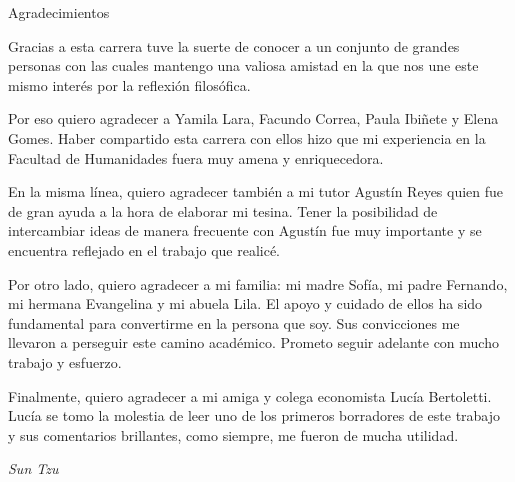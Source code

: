 \begin{center}

\thispagestyle{empty}

\normalsize Agradecimientos

\end{center}

\vspace{3mm}

\normalsize Gracias a esta carrera tuve la suerte de conocer a un conjunto de grandes personas con las cuales mantengo una valiosa amistad en la que nos une este mismo interés por la reflexión filosófica.

Por eso quiero agradecer a Yamila Lara, Facundo Correa, Paula Ibiñete y Elena Gomes. Haber compartido esta carrera con ellos hizo que mi experiencia en la Facultad de Humanidades fuera muy amena y enriquecedora.

En la misma línea, quiero agradecer también a mi tutor Agustín Reyes quien fue de gran ayuda a la hora de elaborar mi tesina. Tener la posibilidad de intercambiar ideas de manera frecuente con Agustín fue muy importante y se encuentra reflejado en el trabajo que realicé.

Por otro lado, quiero agradecer a mi familia: mi madre Sofía, mi padre Fernando, mi hermana Evangelina y mi abuela Lila. El apoyo y cuidado de ellos ha sido fundamental para convertirme en la persona que soy. Sus convicciones me llevaron a perseguir este camino académico. Prometo seguir adelante con mucho trabajo y esfuerzo.

Finalmente, quiero agradecer a mi amiga y colega economista Lucía Bertoletti. Lucía se tomo la molestia de leer uno de los primeros borradores de este trabajo y sus comentarios brillantes, como siempre, me fueron de mucha utilidad.

\newpage

\begin{flushright}

\thispagestyle{empty}


\vspace{3mm}

\textit{Sun Tzu}

\end{flushright}

\newpage